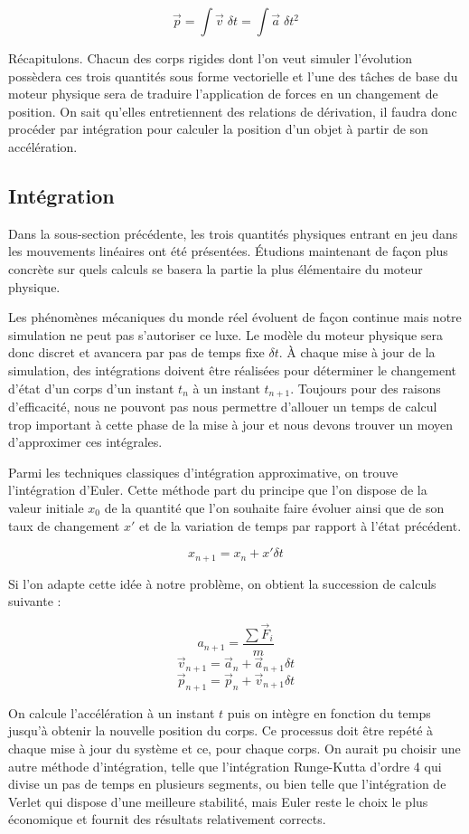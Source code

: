 \[\vec{p} = \int \vec{v}\; \delta t = \int \vec{a}\; \delta t^2\]

Récapitulons. Chacun des corps rigides dont l'on veut simuler l'évolution possèdera ces trois quantités sous forme vectorielle et l'une des tâches de base du moteur physique sera de traduire l'application de forces en un changement de position. On sait qu'elles entretiennent des relations de dérivation, il faudra donc procéder par intégration pour calculer la position d'un objet à partir de son accélération.

\subsection{Intégration}

Dans la sous-section précédente, les trois quantités physiques entrant en jeu dans les mouvements linéaires ont été présentées. \'Etudions maintenant de façon plus concrète sur quels calculs se basera la partie la plus élémentaire du moteur physique.

Les phénomènes mécaniques du monde réel évoluent de façon continue mais notre simulation ne peut pas s'autoriser ce luxe. Le modèle du moteur physique sera donc discret et avancera par pas de temps fixe $\delta t$. \`A chaque mise à jour de la simulation, des intégrations doivent être réalisées pour déterminer le changement d'état d'un corps d'un instant $t_n$ à un instant $t_{n+1}$. Toujours pour des raisons d'efficacité, nous ne pouvont pas nous permettre d'allouer un temps de calcul trop important à cette phase de la mise à jour et nous devons trouver un moyen d'approximer ces intégrales.

Parmi les techniques classiques d'intégration approximative, on trouve l'intégration d'Euler. Cette méthode part du principe que l'on dispose de la valeur initiale $x_0$ de la quantité que l'on souhaite faire évoluer ainsi que de son taux de changement $x'$ et de la variation de temps par rapport à l'état précédent.

\[x_{n+1} = x_{n} + x' \delta t\]

Si l'on adapte cette idée à notre problème, on obtient la succession de calculs suivante :

\[a_{n+1} = \frac{\sum \vec{F}_i}{m}\]
\[\vec{v}_{n+1} = \vec{a}_n + \vec{a}_{n+1} \delta t\]
\[\vec{p}_{n+1} = \vec{p}_n + \vec{v}_{n+1} \delta t\]

On calcule l'accélération à un instant $t$ puis on intègre en fonction du temps jusqu'à obtenir la nouvelle position du corps. Ce processus doit être repété à chaque mise à jour du système et ce, pour chaque corps. On aurait pu choisir une autre méthode d'intégration, telle que l'intégration Runge-Kutta d'ordre 4 qui divise un pas de temps en plusieurs segments, ou bien telle que l'intégration de Verlet qui dispose d'une meilleure stabilité, mais Euler reste le choix le plus économique et fournit des résultats relativement corrects.

